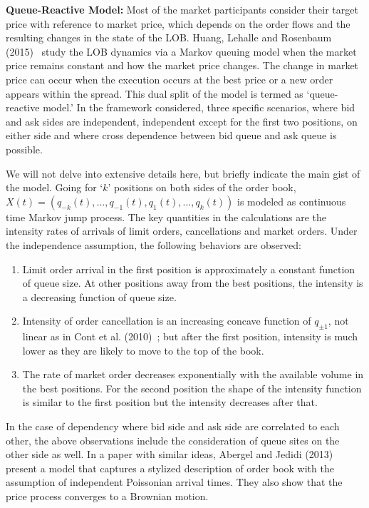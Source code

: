 \noindent\textbf{Queue-Reactive Model:} Most of the market participants consider their target price with reference to market price, which depends on the order flows and the resulting changes in the state of the LOB. Huang, Lehalle and Rosenbaum (2015)~\cite{hlehros} study the LOB dynamics via a Markov queuing model when the market price remains constant and how the market price changes. The change in market price can occur when the execution occurs at the best price or a new order appears within the spread. This dual split of the model is termed as `queue-reactive model.' In the framework considered, three specific scenarios, where bid and ask sides are independent, independent except for the first two positions, on either side and where cross dependence between bid queue and ask queue is possible.


We will not delve into extensive details here, but briefly indicate the main gist of the model. Going for `$k$' positions on both sides of the order book, $X(t)= (q_{-k}(t),\ldots,q_{-1}(t),q_1(t),\ldots,q_k(t))$ is modeled as continuous time Markov jump process. The key quantities in the calculations are the intensity rates of arrivals of limit orders, cancellations and market orders. Under the independence assumption, the following behaviors are observed:

\begin{enumerate}[--]
\item Limit order arrival in the first position is approximately a constant function of queue size. At other positions away from the best positions, the intensity is a decreasing function of queue size. 

\item Intensity of order cancellation is an increasing concave function of $q_{\pm1}$, not linear as in Cont et al. (2010)~\cite{contstoi}; but after the first position, intensity is much lower as they are likely to move to the top of the book.

\item The rate of market order decreases exponentially with the available volume in the best positions. For the second position the shape of the intensity function is similar to the first position but the intensity decreases after that.
\end{enumerate}


In the case of dependency where bid side and ask side are correlated to each other, the above observations include the consideration of queue sites on the other side as well. In a paper with similar ideas, Abergel and Jedidi (2013)~\cite{aberjed} present a model that captures a stylized description of order book with the assumption of independent Poissonian arrival times. They also show that the price process converges to a Brownian motion. \\



